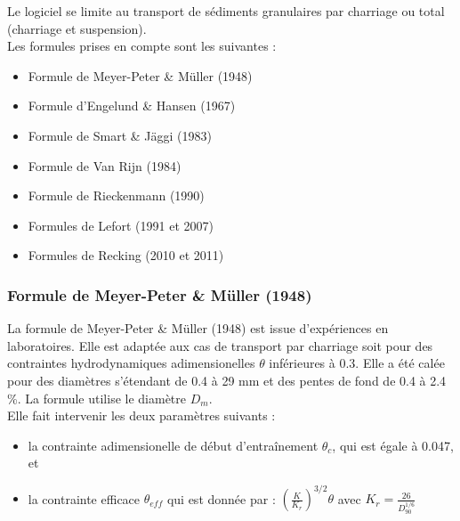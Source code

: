 \documentclass[a4paper,10pt]{article}
\begin{document}
\noindent
Le logiciel se limite au transport de s\'ediments granulaires par charriage ou total (charriage et suspension). \\

\noindent
Les formules prises en compte sont les suivantes :
\begin{itemize}
\item Formule de Meyer-Peter \& M\"uller (1948)
\item Formule d'Engelund \& Hansen (1967)
\item Formule de Smart \& J\"aggi (1983)
\item Formule de Van Rijn (1984)
\item Formule de Rieckenmann (1990)
\item Formules de Lefort (1991 et 2007)
\item Formules de Recking (2010 et 2011) \\
\end{itemize}


\subsubsection{Formule de Meyer-Peter \& M\"uller (1948)}

\noindent
La formule de Meyer-Peter \& M\"uller (1948) est issue d'exp\'eriences en laboratoires. Elle est adapt\'ee aux cas de transport par charriage soit pour des contraintes hydrodynamiques adimensionelles $\theta$ inf\'erieures \`a 0.3. Elle a \'et\'e cal\'ee pour des diam\`etres s'\'etendant de 0.4 \`a 29 mm et des pentes de fond de 0.4 \`a 2.4 \%. La formule utilise le diam\`etre $D_m$. \\

\noindent
Elle fait intervenir les deux param\`etres suivants :
\begin{itemize}
\item la contrainte adimensionelle de d\'ebut d'entra\^inement $\theta_c$, qui est \'egale \`a 0.047, et
\item la contrainte efficace $\theta_{eff}$ qui est donn\'ee par : $\left(\frac{K}{K_r}\right)^{3/2} \theta $ avec $K_r = \frac{26}{D_{90}^{1/6}}$
\end{itemize}
\end{document}
